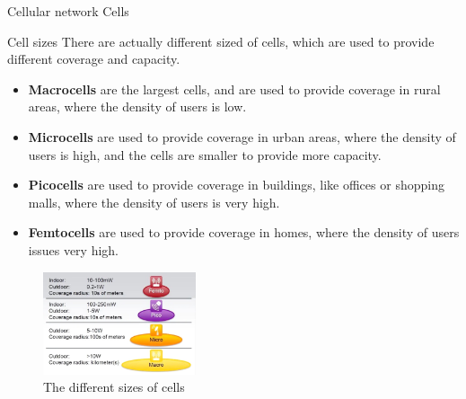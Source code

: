 \begin{section}{Cellular network Cells}
  \begin{subsubsection}{Cell sizes}
    There are actually different sized of cells, which are used to provide different coverage and
    capacity. 
    \begin{itemize}
      \item \textbf{Macrocells} are the largest cells, and are used to provide coverage in rural
        areas, where the density of users is low.
      \item \textbf{Microcells} are used to provide coverage in urban areas, where the density of
        users is high, and the cells are smaller to provide more capacity.
      \item \textbf{Picocells} are used to provide coverage in buildings, like offices or shopping
        malls, where the density of users is very high.
      \item \textbf{Femtocells} are used to provide coverage in homes, where the density of users
        issues very high.
    \end{itemize}
    \begin{figure}[h]
      \centering
      \includegraphics[width=0.4\textwidth]{img/wireless/cell sizes.png}
      \caption{The different sizes of cells}
      \label{fig:cell-sizes}
    \end{figure}
  \end{subsubsection}


\end{section}
